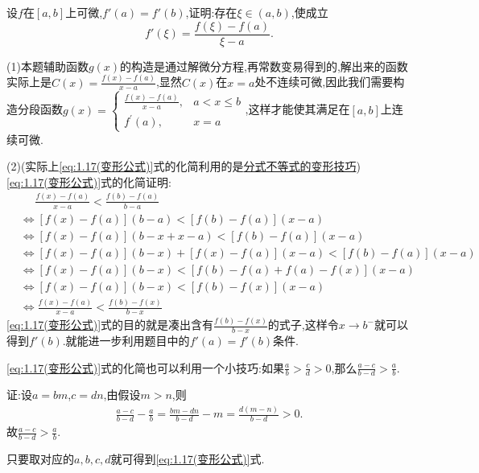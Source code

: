 \documentclass[lang=cn,newtx,10pt,scheme=chinese]{../Template/elegantbook}
\begin{document}
\begin{exercise}
    设\(f\)在\([a,b]\)上可微,\(f'(a) = f'(b)\),证明:存在\(\xi\in(a,b)\),使成立
    \[
    f'(\xi) = \frac{f(\xi) - f(a)}{\xi - a}.
    \]
\end{exercise}
\begin{note}
(1)本题辅助函数$g(x)$的构造是通过解微分方程,再常数变易得到的,解出来的函数实际上是$C(x)=\frac{f(x) - f(a)}{x - a}$,显然$C(x)$在$x=a$处不连续可微,因此我们需要构造分段函数$g(x) = \begin{cases}
    \frac{f(x) - f(a)}{x - a}, & a < x \leqslant  b\\
    f^{\prime}(a), & x = a
\end{cases}$,这样才能使其满足在$[a,b]$上连续可微.

(2)(实际上\eqref{eq:1.17(变形公式)}式的化简利用的是\hyperref[pro:分式不等式等价变形]{分式不等式的变形技巧})
\eqref{eq:1.17(变形公式)}式的\hypertarget{1.17式的化简证明}{化简证明}:
\begin{align*}
    &\,\,\,\,\,\,\,\,\frac{f(x)-f(a)}{x-a}<\frac{f(b)-f(a)}{b-a}
\\
&\Leftrightarrow \left[ f\left( x \right) -f\left( a \right) \right] \left( b-a \right) <\left[ f\left( b \right) -f\left( a \right) \right] \left( x-a \right) 
\\
&\Leftrightarrow \left[ f\left( x \right) -f\left( a \right) \right] \left( b-x+x-a \right) <\left[ f\left( b \right) -f\left( a \right) \right] \left( x-a \right) 
\\
&\Leftrightarrow \left[ f\left( x \right) -f\left( a \right) \right] \left( b-x \right) +\left[ f\left( x \right) -f\left( a \right) \right] \left( x-a \right) <\left[ f\left( b \right) -f\left( a \right) \right] \left( x-a \right) 
\\
&\Leftrightarrow \left[ f\left( x \right) -f\left( a \right) \right] \left( b-x \right) <\left[ f\left( b \right) -f\left( a \right) +f\left( a \right) -f\left( x \right) \right] \left( x-a \right) 
\\
&\Leftrightarrow \left[ f\left( x \right) -f\left( a \right) \right] \left( b-x \right) <\left[ f\left( b \right) -f\left( x \right) \right] \left( x-a \right) 
\\
&\Leftrightarrow \frac{f(x)-f(a)}{x-a}<\frac{f(b)-f(x)}{b-x}
\end{align*}
\eqref{eq:1.17(变形公式)}式的目的就是凑出含有$\frac{f(b)-f(x)}{b-x}$的式子,这样令$x\to b^-$就可以得到$f'(b)$.就能进一步利用题目中的$f'(a)=f'(b)$条件.
\end{note}
\begin{remark}
    \eqref{eq:1.17(变形公式)}式的化简也可以利用一个小技巧:如果\(\frac{a}{b}>\frac{c}{d}>0\),那么\(\frac{a - c}{b - d}>\frac{a}{b}\).

    证:设\(a = bm\),\(c = dn\),由假设\(m>n\),则
    \begin{align*}
        \frac{a - c}{b - d} - \frac{a}{b} = \frac{bm - dn}{b - d} - m = \frac{d(m - n)}{b - d}>0.
    \end{align*}
    故\(\frac{a - c}{b - d}>\frac{a}{b}\).
    
    只要取对应的\(a,b,c,d\)就可得到\eqref{eq:1.17(变形公式)}式.
\end{remark}
\end{document}
